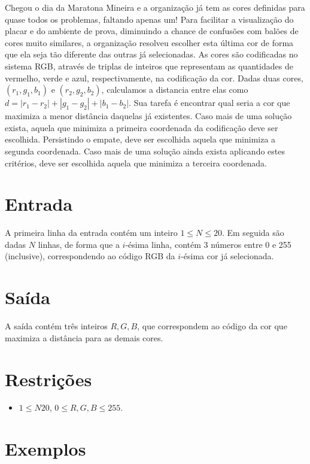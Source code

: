 Chegou o dia da Maratona Mineira e a organização já tem as cores definidas para quase todos os problemas, faltando apenas um!
Para facilitar a visualização do placar e do ambiente de prova, diminuindo a chance de confusões com balões de cores muito similares,
a organização resolveu escolher esta última cor de forma que ela seja tão diferente das outras já selecionadas. As cores são codificadas
no sistema RGB, através de triplas de inteiros que representam as quantidades de vermelho, verde e azul, respectivamente,
na codificação da cor. Dadas duas cores, $(r_1,g_1,b_1)$ e $(r_2,g_2,b_2)$, calculamos a distancia entre elas como $d = |r_1-r_2| + |g_1-g_2| + |b_1-b_2|$.
Sua tarefa é encontrar qual seria a cor que maximiza a menor distância daquelas já existentes. Caso mais de uma solução exista,
aquela que minimiza a primeira coordenada da codificação deve ser escolhida. Persistindo o empate, deve ser escolhida aquela que minimiza
a segunda coordenada. Caso mais de uma solução ainda exista aplicando estes critérios, deve ser escolhida aquela que minimiza a terceira coordenada.

\section*{Entrada}

A primeira linha da entrada contém um inteiro $1 \leq N \leq 20$. Em seguida são dadas $N$ linhas, de forma que a $i$-ésima linha, contém 3 números
entre 0 e 255 (inclusive), correspondendo ao código RGB da $i$-ésima cor já selecionada.

\section*{Saída}

A saída contém três inteiros $R, G, B$, que correspondem ao código da cor que maximiza a distância para as demais cores.

\section*{Restrições}

\begin{itemize}
\item $1 \leq N 20$, $0 \leq R, G, B \leq 255$.
\end{itemize}


\section*{Exemplos}

\sampleio
